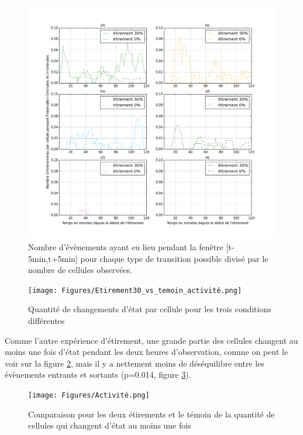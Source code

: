 \documentclass{report}
\begin{document}
 
\begin{figure}
\includegraphics[scale=0.5]{Figures/Etirement30_vs_0_translocations.png}
\caption{\label{Et30_transloc} Nombre d'évènements ayant eu lieu pendant la fenêtre [t-5min,t+5min] pour chaque type de transition possible divisé par le nombre de cellules observées.}
\end{figure}

\begin{figure}
\texttt{[image: Figures/Etirement30\_vs\_temoin\_activité.png]}
\caption{\label{Et30_activité} Quantité de changements d'état par cellule pour les trois conditions différentes}
\end{figure}

Comme l'autre expérience d'étirement, une grande partie des cellules changent au moins une fois d'état pendant les deux heures d'observation, comme on peut le voir sur la figure \ref{Et30_activité}, mais il y a nettement moins de déséquilibre entre les évènements entrants et sortants (p=0.014, figure \ref{Et30_ES}). 

 \begin{figure}
 \texttt{[image: Figures/Activité.png]} 
 \caption{\label{Et30_ES} Comparaison pour les deux étirements et le témoin de la quantité de cellules qui changent d'état au moins une fois}
 \end{figure}
 
\end{document}
